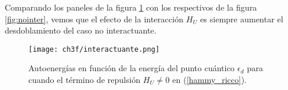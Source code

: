 Comparando los paneles de la figura \ref{fig:inter} con los respectivos de la figura \ref{fig:nointer}, vemos que el efecto de la interacci\'{o}n $H_U$ es siempre aumentar el desdoblamiento del caso no interactuante.
%
\begin{figure}[t]
    \centering
    \texttt{[image: ch3f/interactuante.png]}
    \caption{Autoenergías en función de la energía del punto cuántico $\epsilon_d$ para cuando el t\'{e}rmino de repulsi\'{o}n $H_U\neq 0$ en (\ref{hammy_ricco}).}
    \label{fig:inter}
\end{figure}